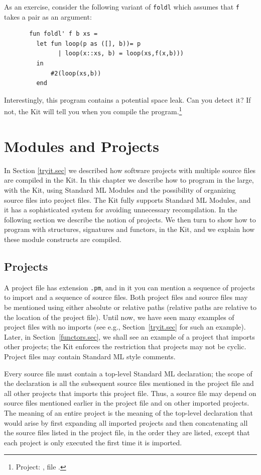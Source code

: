 \documentclass[12pt]{book}
\begin{document}
As an exercise, consider the following variant of {\tt foldl} which assumes that
{\tt f} takes a pair as an argument:
\begin{verbatim}
       fun foldl' f b xs = 
         let fun loop(p as ([], b))= p
               | loop(x::xs, b) = loop(xs,f(x,b)))
         in
             #2(loop(xs,b))
         end
\end{verbatim}
Interestingly, this program contains a potential space leak. Can you
detect it? If not, the Kit will tell you when you compile the program.\footnote{Project:
, file .}


\chapter{Modules and Projects}

In Section \ref{tryit.sec} we described how software projects with
multiple source files are compiled in the Kit. In this chapter we
describe how to program in the large, with the Kit, using Standard ML
Modules and the possibility of organizing source files into project
files. The Kit fully supports Standard ML Modules, and it has a
sophisticated system for avoiding unnecessary recompilation. In the
following section we describe the notion of projects. We then turn to
show how to program with structures, signatures and functors, in the
Kit, and we explain how these module constructs are compiled.


\section{Projects \label{projects.sec}}
A project file has extension {\tt .pm}, and in it you can mention a
sequence of projects to import and a sequence of source files. Both
project files and source files may be mentioned using either absolute
or relative paths (relative paths are relative to the location of the
project file). Until now, we have seen many examples of project files
with no imports (see e.g., Section~\ref{tryit.sec} for such an
example). Later, in Section~\ref{functors.sec}, we shall see an
example of a project that imports other projects; the Kit enforces the
restriction that projects may not be cyclic. Project files may contain
Standard ML style comments.

Every source file must contain a top-level Standard ML declaration;
the scope of the declaration is all the subsequent source files
mentioned in the project file and all other projects that imports
this project file. Thus, a source file may depend on source files
mentioned earlier in the project file and on other imported projects.
The meaning of an entire project is the meaning of the top-level
declaration that would arise by first expanding all imported projects
and then concatenating all the source files listed in the project
file, in the order they are listed, except that each project is 
only executed the first time it is imported. 
\end{document}
